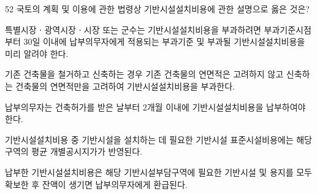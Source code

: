 \begin{question}{52}
국토의 계획 및 이용에 관한 법령상 기반시설설치비용에 관한 설명으로 옳은 것은?
\begin{choices}
  \item 특별시장ㆍ광역시장ㆍ시장 또는 군수는 기반시설설치비용을 부과하려면 부과기준시점부터 30일 이내에 납부의무자에게 적용되는 부과기준 및 부과될 기반시설설치비용을 미리 알려야 한다.
  \item 기존 건축물을 철거하고 신축하는 경우 기존 건축물의 연면적은 고려하지 않고 신축하는 건축물의 연면적만을 고려하여 기반시설설치비용을 부과한다.
  \item 납부의무자는 건축허가를 받은 날부터 2개월 이내에 기반시설설치비용을 납부하여야 한다.
  \item 기반시설설치비용 중 기반시설을 설치하는 데 필요한 기반시설 표준시설비용에는 해당 구역의 평균 개별공시지가가 반영된다.
  \item 납부한 기반시설설치비용은 해당 기반시설부담구역에 필요한 기반시설 및 용지를 모두 확보한 후 잔액이 생기면 납부의무자에게 환급된다.
\end{choices}
\end{question}
